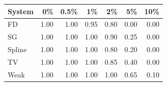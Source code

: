 \begin{tabular}{lrrrrrr}\toprule
System & 0\% & 0.5\% & 1\% & 2\% & 5\% & 10\% \\\midrule
FD & 1.00 & 1.00 & 0.95 & 0.80 & 0.00 & 0.00 \\
SG & 1.00 & 1.00 & 1.00 & 0.90 & 0.25 & 0.00 \\
Spline & 1.00 & 1.00 & 1.00 & 0.80 & 0.20 & 0.00 \\
TV & 1.00 & 1.00 & 1.00 & 0.85 & 0.40 & 0.00 \\
Weak & 1.00 & 1.00 & 1.00 & 1.00 & 0.65 & 0.10 \\
\bottomrule\end{tabular}
